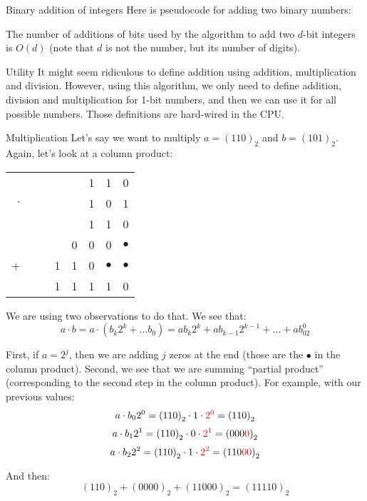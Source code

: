 \documentclass[a4paper]{article}
\begin{document}
\begin{parag}{Binary addition of integers}
    Here is pseudocode for adding two binary numbers:
    
    The number of additions of bits used by the algorithm to add two $d$-bit integers is $O\left(d\right)$ (note that $d$ is not the number, but its number of digits).

    \begin{subparag}{Utility}
        It might seem ridiculous to define addition using addition, multiplication and division. However, using this algorithm, we only need to define addition, division and multiplication for 1-bit numbers, and then we can use it for all possible numbers. Those definitions are hard-wired in the CPU. 
    \end{subparag}
\end{parag}

\begin{parag}{Multiplication}
    Let's say we want to multiply $a = \left(110\right)_2$ and $b = \left(101\right)_2$. Again, let's look at a column product:
    \begin{center}
    \begin{tabular}{r@{\,}r@{\,}r@{\,}r@{\,}r@{\,}r@{\,}r@{\,}r@{\,}}
        & & & & & 1 & 1 & 0  \\
        $\cdot$ & & & & & 1 & 0 & 1  \\
        \hline
        & & & & & 1 & 1 & 0  \\
        & & & & 0 & 0 & 0 & $\bullet$  \\
        + & & & 1 & 1 & 0 & $\bullet$ & $\bullet$  \\
        \hline
          & &  & 1 & 1 & 1 & 1 & 0

    \end{tabular}
    \end{center}

    We are using two observations to do that. We see that: 
    \[a\cdot b = a\cdot\left(b_k2^k + \ldots b_0\right) = ab_k2^k + ab_{k-1}2^{k-1} + \ldots + ab_02^0\]

    First, if $a = 2^j$, then we are adding $j$ zeros at the end (those are the $\bullet$ in the column product). Second, we see that we are summing ``partial product'' (corresponding to the second step in the column product). For example, with our previous values: 
    \[a\cdot b_02^0 = \left(110\right)_2 \cdot 1 \cdot {\color{red}2^0} = \left(110\right)_2\]
    \[a\cdot b_12^1 = \left(110\right)_2 \cdot 0 \cdot {\color{red} 2^1} = \left(000{\color{red}0}\right)_2\]
    \[a\cdot b_2 2^2 = \left(110\right)_2 \cdot 1\cdot {\color{red}2^2} = \left(110{\color{red}00}\right)_2\]
    
    And then: 
    \[\left(110\right)_2 + \left(0000\right)_2 + \left(11000\right)_2 = \left(11110\right)_2\]
\end{parag}
\end{document}
